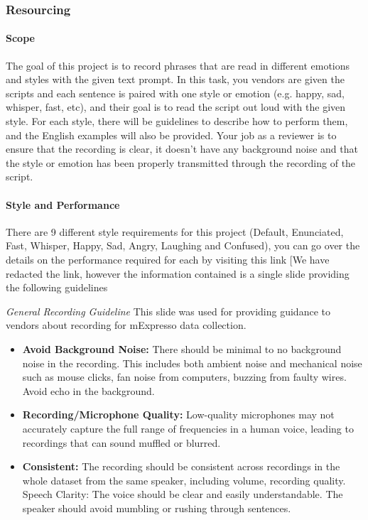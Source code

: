 \subsubsection{Resourcing}

\paragraph{\textbf{Scope}}

The goal of this project is to record phrases that are read in different emotions and styles with the given text prompt. In this task, you vendors are given the scripts and each sentence is paired with one style or emotion (e.g. happy, sad, whisper, fast, etc), and their goal is to read the script out loud with
the given style. For each style, there will be guidelines to describe how to perform them, and the English examples will also be provided. Your job as a reviewer is to ensure that the recording is clear, it doesn’t have any background
noise and that the style or emotion has been properly transmitted through the recording of the script.

\paragraph{\textbf{Style and Performance}}

There are 9 different style requirements for this project (Default, Enunciated, Fast, Whisper, Happy, Sad, Angry, Laughing and Confused), you can go over the details on the performance required for each by visiting this link [We have redacted the link, however the information contained is a single slide providing the following guidelines

\begin{boxA}
\textit{General Recording Guideline}
This slide was used for providing guidance to vendors about recording for mExpresso data collection.
\begin{itemize}
\item \textbf{Avoid Background Noise:} There should be minimal to no background noise in the recording. This includes both ambient noise and mechanical noise such as mouse clicks, fan noise from computers, buzzing from faulty wires. Avoid echo in the background.
\item \textbf{Recording/Microphone Quality:} Low-quality microphones may not accurately capture the full range of frequencies in a human voice, leading to recordings that can sound muffled or blurred.
\item \textbf{Consistent:} The recording should be consistent across recordings in the whole dataset from the same speaker, including volume, recording quality.
Speech Clarity: The voice should be clear and easily understandable. The speaker should avoid mumbling or rushing through sentences.
\end{itemize}
\end{boxA}

